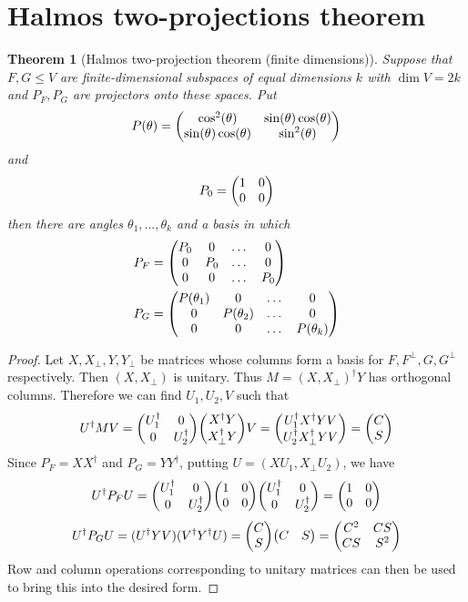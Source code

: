 \documentclass[11pt]{article}
\newtheorem{thm}{Theorem}
\begin{document}
\section{Halmos two-projections theorem}
\begin{thm}[Halmos two-projection theorem (finite dimensions)]
Suppose that $F, G \leq V$ are finite-dimensional subspaces of equal dimensions $k$ with $\dim V = 2k$ and $P_F, P_G$ are projectors onto these spaces. Put
$$
P(\theta) = \mqty(\cos[2](\theta) & \sin(\theta)\cos(\theta) \\ \sin(\theta)\cos(\theta)  & \sin[2](\theta))
$$
and
$$
P_0 = \mqty(1 & 0 \\ 0 & 0)
$$
then there are angles $\theta_1, \dots, \theta_k$ and a basis in which
\begin{align}
    P_F &= \mqty(P_0 & 0 & \dots & 0 \\ 0 & P_0 & \dots & 0 \\ 0 & 0 & \dots & P_0) \\
    P_G &= \mqty(P(\theta_1) & 0 & \dots & 0\\ 0 & P(\theta_2) & \dots & 0 \\ 0 & 0 & \dots & P(\theta_k))
\end{align}
\end{thm}
\begin{proof}
    Let $X,X_\perp, Y, Y_{\perp}$ be matrices whose columns form a basis for $F,F^\perp, G, G^\perp$ respectively.  Then $(X, X_\perp)$ is unitary. Thus $M = (X, X_\perp)^\dagger Y$ has orthogonal columns. Therefore we can find $U_1, U_2, V$ such that
$$
U^\dagger M V = \mqty(U_1^\dagger & 0 \\ 0 & U_2^\dagger)\mqty(X^\dagger Y \\ X_\perp^\dagger Y)V = \mqty(U_1^\dagger X^\dagger YV \\ U_2^\dagger X_\perp^\dagger YV) = \mqty(C \\ S)
$$
Since $P_F = XX^\dagger$ and $P_G = YY^\dagger$, putting $U = (XU_1, X_{\perp} U_2)$, we have 
$$
U^\dagger P_F U = \mqty(U_1^\dagger & 0 \\ 0 & U_2^\dagger)\mqty(1 & 0 \\ 0 & 0) \mqty(U_1^\dagger & 0 \\ 0 & U_2^\dagger) = \mqty(1 & 0 \\ 0 & 0)
$$
$$
U^\dagger P_G U = (U^\dagger Y V)(V^\dagger Y^\dagger U) = \mqty(C \\ S) \mqty(C & S) = \mqty(C^2 & CS \\ CS & S^2)
$$
Row and column operations corresponding to unitary matrices can then be used to bring this into the desired form.
\end{proof}
\end{document}
